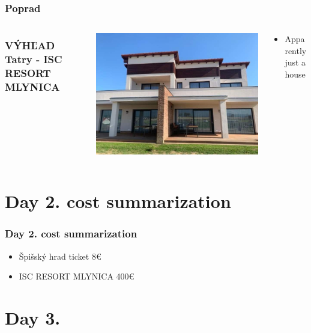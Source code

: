 \documentclass{beamer}
\begin{document}
	\begin{frame}
		\frametitle{Poprad}

		\begin{columns}
			\frametitle{VÝHĽAD Tatry - ISC RESORT MLYNICA}
			\begin{column}{0.5\textwidth}
				\includegraphics[width=\textwidth]{day2/hotel}
			\end{column}
			\begin{column}{0.5\textwidth}
				\begin{itemize}
					\item Apparently just a house
				\end{itemize}
			\end{column}
		\end{columns}
	\end{frame}

	\section{Day 2. cost summarization}

	\begin{frame}
		\frametitle{Day 2. cost summarization}

		\begin{itemize}
			\item Špišský hrad ticket 8€
			\item ISC RESORT MLYNICA 400€
		\end{itemize}
	\end{frame}

	\section{Day 3.}
\end{document}
